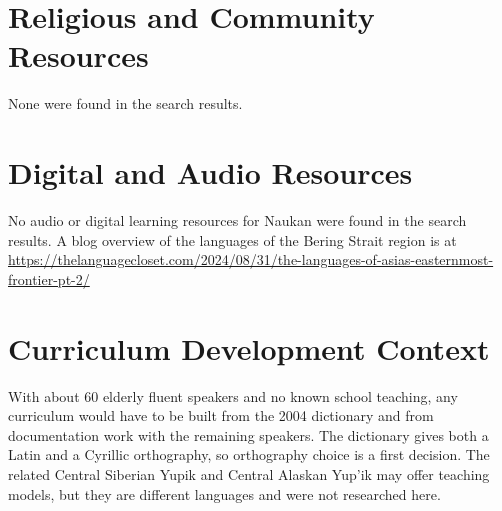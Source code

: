 \documentclass[12pt]{article}
\begin{document}
\section{Religious and Community Resources}
None were found in the search results.

\section{Digital and Audio Resources}
No audio or digital learning resources for Naukan were found in the search results. A blog overview of the languages of the Bering Strait region is at \url{https://thelanguagecloset.com/2024/08/31/the-languages-of-asias-easternmost-frontier-pt-2/}

\section{Curriculum Development Context}
With about 60 elderly fluent speakers and no known school teaching, any curriculum would have to be built from the 2004 dictionary and from documentation work with the remaining speakers. The dictionary gives both a Latin and a Cyrillic orthography, so orthography choice is a first decision. The related Central Siberian Yupik and Central Alaskan Yup'ik may offer teaching models, but they are different languages and were not researched here.
\end{document}
